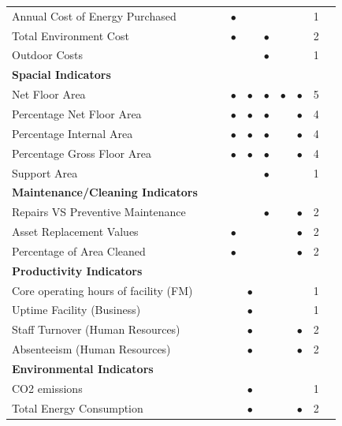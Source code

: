\begin{table}
\begin{adjustwidth}{2cm}{0cm}
{\begin{tabular}{p{6cm}llllllp{1cm}lr}
		Annual Cost of Energy Purchased 	& & &$\bullet$ & & & & & 1 \\
		Total Environment Cost 				& & &$\bullet$ & &$\bullet$ & & & 2 \\
		Outdoor Costs 						& & & & &$\bullet$ & & & 1 \\
		\hline
		{\bf Spacial Indicators}	& & & & & & & & \\
		Net Floor Area 						& & &$\bullet$ &$\bullet$ &$\bullet$ &$\bullet$ &$\bullet$ & 5  \\
		Percentage Net Floor Area 			& & &$\bullet$ &$\bullet$ &$\bullet$ & &$\bullet$ & 4 \\
		Percentage Internal Area			& & &$\bullet$ &$\bullet$ &$\bullet$ & &$\bullet$ & 4 \\
		Percentage Gross Floor Area 		& & &$\bullet$ &$\bullet$ &$\bullet$ & &$\bullet$ & 4 \\
		Support Area 						& & & & &$\bullet$ & & & 1 \\
		\hline
		{\bf Maintenance/Cleaning Indicators}							& & & & & & & & \\
		Repairs VS Preventive Maintenance 										& & & & &$\bullet$ & &$\bullet$ & 2 \\
		Asset Replacement Values												& & &$\bullet$ & & & &$\bullet$ & 2 \\
		Percentage of Area Cleaned			 									& & &$\bullet$ & & & &$\bullet$ & 2 \\
		\hline
		{\bf Productivity Indicators} & & & & & & & & \\
		Core operating hours of facility (FM) 		& & & &$\bullet$ & & & & 1 \\
		Uptime Facility (Business)					& & & &$\bullet$ & & & & 1 \\
		Staff Turnover (Human Resources) 			& & & &$\bullet$ & & &$\bullet$ & 2 \\
		Absenteeism (Human Resources) 				& & & &$\bullet$ & & &$\bullet$ & 2 \\
		\hline
		{\bf Environmental Indicators} & & & & & & & & \\
		CO2 emissions 						& & & &$\bullet$ & & & & 1 \\
		Total Energy Consumption 	 		& & & &$\bullet$ & & &$\bullet$ & 2 \\

\end{tabular}}
\end{adjustwidth}
\end{table}
